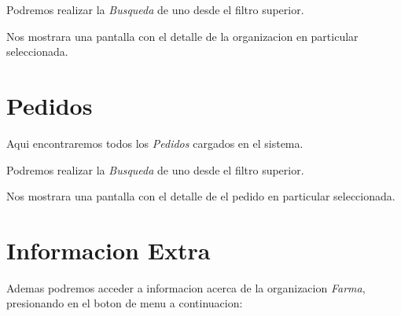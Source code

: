 \documentclass[a4paper,10pt,spanish]{sphinxmanual}
\begin{document}

Podremos realizar la \emph{Busqueda} de uno desde el filtro superior.


Nos mostrara una pantalla con el detalle de la organizacion en particular seleccionada.



\section{Pedidos}
\label{vistamovil:pedidos}\label{vistamovil:id3}
Aqui encontraremos todos los \emph{Pedidos} cargados en el sistema.


Podremos realizar la \emph{Busqueda} de uno desde el filtro superior.


Nos mostrara una pantalla con el detalle de el pedido en particular seleccionada.



\section{Informacion Extra}
\label{vistamovil:info}\label{vistamovil:informacion-extra}
Ademas podremos acceder a informacion acerca de la organizacion \emph{Farma}, presionando en el boton de menu a continuacion:

\end{document}
